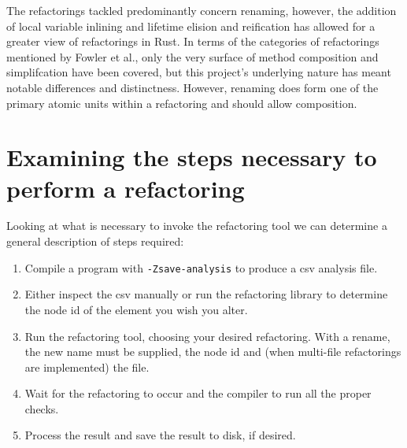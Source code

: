 The refactorings tackled predominantly concern renaming, however, the addition of local variable inlining and lifetime elision and reification has allowed for a greater view of refactorings in Rust. In terms of the categories of refactorings mentioned by Fowler et al., only the very surface of method composition and simplifcation have been covered, but this project's underlying nature has meant notable differences and distinctness. However, renaming does form one of the primary atomic units within a refactoring and should allow composition.











\section{Examining the steps necessary to perform a refactoring}

Looking at what is necessary to invoke the refactoring tool we can determine a general description of steps required:

\begin{enumerate}
\item Compile a program with {\verb|-Zsave-analysis|} to produce a csv analysis file.
\item Either inspect the csv manually or run the refactoring library to determine the node id of the element you wish you alter.
\item Run the refactoring tool, choosing your desired refactoring. With a rename, the new name must be supplied, the node id and (when multi-file refactorings are implemented) the file.
\item Wait for the refactoring to occur and the compiler to run all the proper checks. 
\item Process the result and save the result to disk, if desired.
\end{enumerate}

